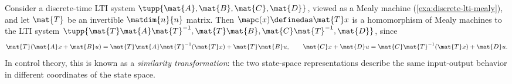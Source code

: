 \begin{example}
    \label{exa:lti-similarity-transformation}
    Consider a discrete-time LTI system $\tupp{\mat{A}, \mat{B}, \mat{C}, \mat{D}}$, viewed as a Mealy machine (\cref{exa:discrete-lti-mealy}), and let $\mat{T}$ be an invertible $\matdim{n}{n}$ matrix.
    Then $\mapc(x) \definedas \mat{T}x$ is a homomorphism of Mealy machines to the LTI system $\tupp{\mat{T}\mat{A}\mat{T}^{-1}, \mat{T}\mat{B}, \mat{C}\mat{T}^{-1}, \mat{D}}$, since
    \begin{equation}
        \mat{T}(\mat{A}x + \mat{B}u) = \mat{T}\mat{A}\mat{T}^{-1}(\mat{T}x) + \mat{T}\mat{B}u,
        \qquad
        \mat{C}x + \mat{D}u = \mat{C}\mat{T}^{-1}(\mat{T}x) + \mat{D}u.
    \end{equation}
    In control theory, this is known as a \emph{similarity transformation}: the two state-space representations describe the same input-output behavior in different coordinates of the state space.
\end{example}


